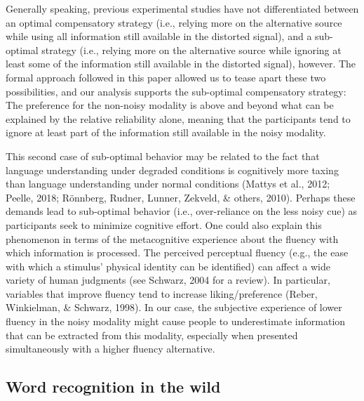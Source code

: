 \documentclass[english,,man,floatsintext]{apa6}
\theoremstyle{definition}
\theoremstyle{definition}
\theoremstyle{definition}
\theoremstyle{remark}
\begin{document}
Generally speaking, previous experimental studies have not
differentiated between an optimal compensatory strategy (i.e., relying
more on the alternative source while using all information still
available in the distorted signal), and a sub-optimal strategy (i.e.,
relying more on the alternative source while ignoring at least some of
the information still available in the distorted signal), however. The
formal approach followed in this paper allowed us to tease apart these
two possibilities, and our analysis supports the sub-optimal
compensatory strategy: The preference for the non-noisy modality is
above and beyond what can be explained by the relative reliability
alone, meaning that the participants tend to ignore at least part of the
information still available in the noisy modality.

This second case of sub-optimal behavior may be related to the fact that
language understanding under degraded conditions is cognitively more
taxing than language understanding under normal conditions (Mattys et
al., 2012; Peelle, 2018; Rönnberg, Rudner, Lunner, Zekveld, \& others,
2010). Perhaps these demands lead to sub-optimal behavior (i.e.,
over-reliance on the less noisy cue) as participants seek to minimize
cognitive effort. One could also explain this phenomenon in terms of the
metacognitive experience about the fluency with which information is
processed. The perceived perceptual fluency (e.g., the ease with which a
stimulus' physical identity can be identified) can affect a wide variety
of human judgments (see Schwarz, 2004 for a review). In particular,
variables that improve fluency tend to increase liking/preference
(Reber, Winkielman, \& Schwarz, 1998). In our case, the subjective
experience of lower fluency in the noisy modality might cause people to
underestimate information that can be extracted from this modality,
especially when presented simultaneously with a higher fluency
alternative.

\subsection{Word recognition in the
wild}\label{word-recognition-in-the-wild}
\end{document}

